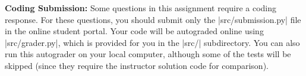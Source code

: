 {\bf Coding Submission:}
Some questions in this assignment require a coding response.  For these questions, you should submit only the |src/submission.py| file in the online student portal.  Your code will be
autograded online using |src/grader.py|, which is provided for you in the |src/|
subdirectory. You can also run this autograder on your local computer, although some of the tests will be skipped (since they
require the instructor solution code for comparison).